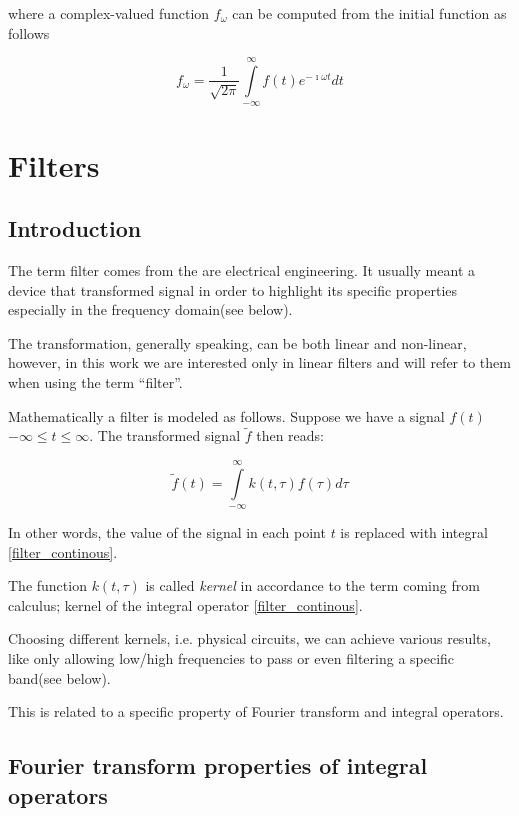 \documentclass[11pt]{book}
\begin{document}
where a complex-valued function $f_\omega$ can be computed from the initial function as follows 

\begin{equation}
f_{\omega} =\frac{1}{\sqrt{2\pi}} \int\limits_{-\infty}^\infty f(t) e^{-\imath\omega t} dt
\end{equation}

\section{Filters}

\subsection{Introduction}

The term filter comes from the are electrical engineering. It usually meant a device that transformed signal in order to highlight its specific properties especially in the frequency domain(see below). 

The transformation, generally speaking,  can be both linear and non-linear, however, in this work we are interested only in linear filters and will refer to them when using the term ``filter''.

Mathematically a filter is modeled as follows. Suppose we have a signal $f(t)$ $-\infty \leq t \leq \infty$. The transformed signal $\tilde{f}$ then reads:

\begin{equation}
 \tilde{f}(t) = \int\limits_{-\infty}^\infty k(t,\tau) f(\tau) d\tau\label{filter_continous}
\end{equation}

In other words, the value of the signal in each point $t$ is replaced with integral \eqref{filter_continous}. 

The function $k(t,\tau)$ is called {\it kernel} in accordance to the term coming from calculus; kernel of the integral operator \eqref{filter_continous}.

Choosing different kernels, i.e. physical circuits, we can achieve various results, like only allowing low/high frequencies to pass or even filtering a specific band(see below). 

This is related to a specific property of Fourier transform and integral operators.

\subsection{Fourier transform properties of integral operators}
\end{document}
